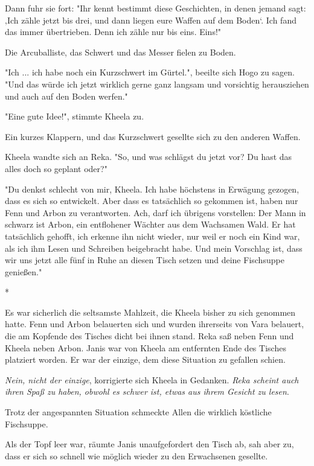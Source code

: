 \documentclass[10pt, a4paper, oneside]{book}
\begin{document}
\begin{multicols}{2}
Dann fuhr sie fort: "Ihr kennt bestimmt diese Geschichten, in denen jemand sagt: ‚Ich zähle jetzt bis drei, und dann liegen eure Waffen auf dem Boden‘. Ich fand das immer übertrieben. Denn ich zähle nur bis eins. Eins!" 

Die Arcuballiste, das Schwert und das Messer fielen zu Boden. 

"Ich ... ich habe noch ein Kurzschwert im Gürtel.", beeilte sich Hogo zu sagen. "Und das würde ich jetzt wirklich gerne ganz langsam und vorsichtig herausziehen und auch auf den Boden werfen." 

"Eine gute Idee!", stimmte Kheela zu.

Ein kurzes Klappern, und das Kurzschwert gesellte sich zu den anderen Waffen. 

Kheela wandte sich an Reka. "So, und was schlägst du jetzt vor? Du hast das 
alles doch so geplant oder?"

"Du denkst schlecht von mir, Kheela. Ich habe höchstens in Erwägung gezogen, dass es sich so entwickelt. Aber dass es tatsächlich so gekommen ist, haben nur Fenn und Arbon zu verantworten. Ach, darf ich übrigens vorstellen: Der Mann in schwarz ist Arbon, ein entflohener Wächter aus dem Wachsamen Wald. Er hat tatsächlich gehofft, ich erkenne ihn nicht wieder, nur weil er noch ein Kind war, als ich ihm Lesen und Schreiben beigebracht habe. Und mein Vorschlag ist, dass wir uns jetzt alle fünf in Ruhe an diesen Tisch setzen und deine Fischsuppe genießen." 

\begin{center}
    * 
\end{center}

Es war sicherlich die seltsamste Mahlzeit, die Kheela bisher zu sich genommen 
hatte. Fenn und Arbon belauerten sich und wurden ihrerseits von Vara belauert, die am Kopfende des Tisches dicht bei ihnen stand. Reka saß neben Fenn und Kheela neben Arbon. Janis war von Kheela am entfernten Ende des Tisches platziert worden. Er war der einzige, dem diese Situation zu gefallen schien. 

\textit{Nein, nicht der einzige}, korrigierte sich Kheela in Gedanken. \textit{Reka scheint auch ihren Spaß zu haben, obwohl es schwer ist, etwas aus ihrem Gesicht zu lesen}. 

Trotz der angespannten Situation schmeckte Allen die wirklich köstliche Fischsuppe. 

Als der Topf leer war, räumte Janis unaufgefordert den Tisch ab, sah aber zu, dass er sich so schnell wie möglich wieder zu den Erwachsenen gesellte. 


\end{multicols}
\end{document}
